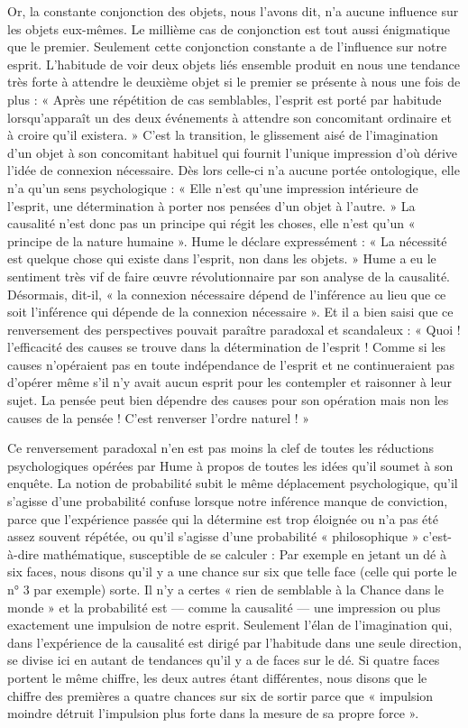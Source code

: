 Or, la constante conjonction des objets, nous l’avons
dit, n’a aucune influence sur les objets eux-mêmes. Le
millième cas de conjonction est tout aussi énigmatique
que le premier. Seulement cette conjonction constante a
de l'influence sur notre esprit. L’habitude de voir deux
objets liés ensemble produit en nous une tendance très
forte à attendre le deuxième objet si le premier se présente
à nous une fois de plus : « Après une répétition de cas
semblables, l’esprit est porté par habitude lorsqu’apparaît
un des deux événements à attendre son concomitant
ordinaire et à croire qu’il existera. » C’est la transition,
le glissement aisé de l’imagination d’un objet à son concomitant 
habituel qui fournit l’unique impression d’où
dérive l’idée de connexion nécessaire. Dès lors celle-ci
n’a aucune portée ontologique, elle n’a qu’un sens 
psychologique : « Elle n’est qu’une impression intérieure de
l'esprit, une détermination à porter nos pensées d’un objet
à l’autre. » La causalité n’est donc pas un principe qui
régit les choses, elle n’est qu’un « principe de la nature
humaine ». Hume le déclare expressément : « La nécessité
est quelque chose qui existe dans l’esprit, non dans les
objets. » Hume a eu le sentiment très vif de faire œuvre
révolutionnaire par son analyse de la causalité. Désormais,
dit-il, « la connexion nécessaire dépend de l’inférence au
lieu que ce soit l’inférence qui dépende de la connexion
nécessaire ». Et il a bien saisi que ce renversement des
perspectives pouvait paraître paradoxal et scandaleux :
« Quoi ! l'efficacité des causes se trouve dans la détermination 
de l’esprit ! Comme si les causes n’opéraient pas en
toute indépendance de l'esprit et ne continueraient pas
d’opérer même s’il n’y avait aucun esprit pour les contempler 
et raisonner à leur sujet. La pensée peut bien dépendre
des causes pour son opération mais non les causes de la
pensée ! C’est renverser l’ordre naturel ! »

Ce renversement paradoxal n’en est pas moins la clef
de toutes les réductions psychologiques opérées par Hume
à propos de toutes les idées qu’il soumet à son enquête.
La notion de probabilité subit le même déplacement
psychologique, qu’il s’agisse d’une probabilité confuse
lorsque notre inférence manque de conviction, parce que
l'expérience passée qui la détermine est trop éloignée ou
n’a pas été assez souvent répétée, ou qu’il s’agisse d’une
probabilité « philosophique » c’est-à-dire mathématique,
susceptible de se calculer : Par exemple en jetant un dé
à six faces, nous disons qu’il y a une chance sur six que
telle face (celle qui porte le n° 3 par exemple) sorte. Il
n’y a certes « rien de semblable à la Chance dans le monde »
et la probabilité est — comme la causalité — une impression ou plus exactement une impulsion de notre esprit.
Seulement l'élan de l’imagination qui, dans l’expérience
de la causalité est dirigé par l'habitude dans une seule
direction, se divise ici en autant de tendances qu’il y a
de faces sur le dé. Si quatre faces portent le même chiffre,
les deux autres étant différentes, nous disons que le chiffre
des premières a quatre chances sur six de sortir parce que
« impulsion moindre détruit l’impulsion plus forte dans
la mesure de sa propre force ».

